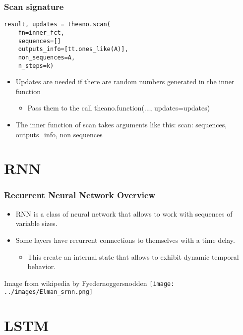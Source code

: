\documentclass[utf8x,xcolor=pdftex,dvipsnames,table]{beamer}
\begin{document}
\begin{frame}[fragile]
  \frametitle{Scan signature}

\begin{lstlisting}
result, updates = theano.scan(
    fn=inner_fct,
    sequences=[]
    outputs_info=[tt.ones_like(A)],
    non_sequences=A,
    n_steps=k)
\end{lstlisting}

\begin{itemize}
\item Updates are needed if there are random numbers generated in the inner function
\begin{itemize}
\item Pass them to the call theano.function(..., updates=updates)
\end{itemize}
\item The inner function of scan takes arguments like this:
   scan: sequences, outputs\_info, non sequences
\end{itemize}

\end{frame}


\section{RNN}
\begin{frame}
  \tableofcontents[currentsection]
\end{frame}

\begin{frame}
  \frametitle{Recurrent Neural Network Overview}
\begin{itemize}
\item RNN is a class of neural network that allows to work with sequences of variable sizes.
\item Some layers have recurrent connections to themselves with a time delay.
  \begin{itemize}
  \item This create an internal state that allows to exhibit dynamic temporal behavior.
  \end{itemize}
\end{itemize}
Image from wikipedia by Fyedernoggersnodden
\texttt{[image: ../images/Elman\_srnn.png]}
\end{frame}

\section{LSTM}
\begin{frame}
  \tableofcontents[currentsection]
\end{frame}
\end{document}
